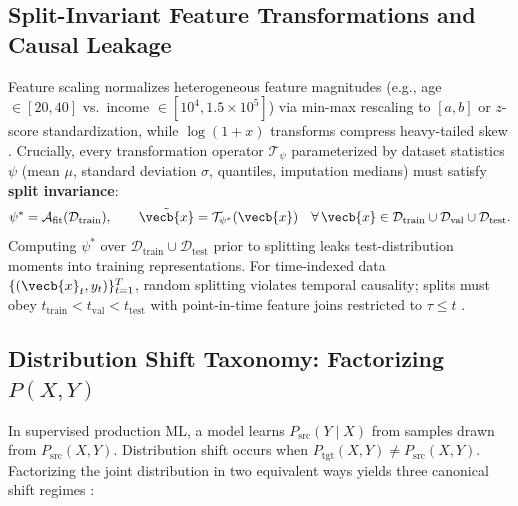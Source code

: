 \documentclass[../../../../master.tex]{subfiles}
\begin{document}
\subsection{Split-Invariant Feature Transformations and Causal Leakage}

Feature scaling normalizes heterogeneous feature magnitudes (e.g., age $\in [20, 40]$ vs.\ income $\in [10^4, 1.5\times 10^5]$) via min-max rescaling to $[a, b]$ or $z$-score standardization, while $\log(1+x)$ transforms compress heavy-tailed skew . Crucially, every transformation operator $\mathcal{T}_{\psi}$ parameterized by dataset statistics $\psi$ (mean $\mu$, standard deviation $\sigma$, quantiles, imputation medians) must satisfy \textbf{split invariance}:
\begin{equation}\label{eq:mlsys:split_invariance}
  \psi^* = \mathcal{A}_{\mathrm{fit}}(\mathcal{D}_{\mathrm{train}}), \qquad
  \tilde{\vecb{x}} = \mathcal{T}_{\psi^*}(\vecb{x}) \quad \forall\, \vecb{x} \in \mathcal{D}_{\mathrm{train}} \cup \mathcal{D}_{\mathrm{val}} \cup \mathcal{D}_{\mathrm{test}}.
\end{equation}
Computing $\psi^*$ over $\mathcal{D}_{\mathrm{train}} \cup \mathcal{D}_{\mathrm{test}}$ prior to splitting leaks test-distribution moments into training representations. For time-indexed data $\{(\vecb{x}_t, y_t)\}_{t=1}^T$, random splitting violates temporal causality; splits must obey $t_{\mathrm{train}} < t_{\mathrm{val}} < t_{\mathrm{test}}$ with point-in-time feature joins restricted to $\tau \le t$ .

\subsection{Distribution Shift Taxonomy: Factorizing $P(X, Y)$}

In supervised production ML, a model learns $P_{\mathrm{src}}(Y \mid X)$ from samples drawn from $P_{\mathrm{src}}(X, Y)$. Distribution shift occurs when $P_{\mathrm{tgt}}(X, Y) \ne P_{\mathrm{src}}(X, Y)$. Factorizing the joint distribution in two equivalent ways yields three canonical shift regimes :
\end{document}
